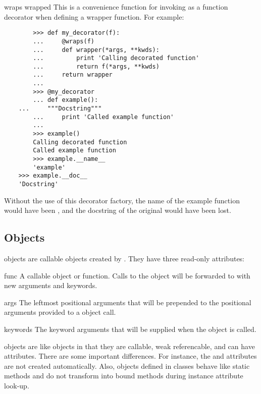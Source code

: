 \begin{funcdesc}{wraps}
{wrapped}
This is a convenience function for invoking
as a function decorator when defining a wrapper function. For example:
  \begin{verbatim}
        >>> def my_decorator(f):
        ...     @wraps(f)
        ...     def wrapper(*args, **kwds):
        ...         print 'Calling decorated function'
        ...         return f(*args, **kwds)
        ...     return wrapper
        ...
        >>> @my_decorator
        ... def example():
	...     """Docstring"""
        ...     print 'Called example function'
        ...
        >>> example()
        Calling decorated function
        Called example function
        >>> example.__name__
        'example'
	>>> example.__doc__
	'Docstring'
  \end{verbatim}
Without the use of this decorator factory, the name of the example
function would have been , and the docstring of the
original  would have been lost.
\end{funcdesc}


\subsection{ Objects \label{partial-objects}}


 objects are callable objects created by .
They have three read-only attributes:

\begin{memberdesc}[callable]{func}{}
A callable object or function.  Calls to the  object will
be forwarded to  with new arguments and keywords.
\end{memberdesc}

\begin{memberdesc}[tuple]{args}{}
The leftmost positional arguments that will be prepended to the
positional arguments provided to a  object call.
\end{memberdesc}

\begin{memberdesc}[dict]{keywords}{}
The keyword arguments that will be supplied when the  object
is called.
\end{memberdesc}

 objects are like  objects in that they are
callable, weak referencable, and can have attributes.  There are some
important differences.  For instance, the  and
 attributes are not created automatically.  Also,
 objects defined in classes behave like static methods and
do not transform into bound methods during instance attribute look-up.
